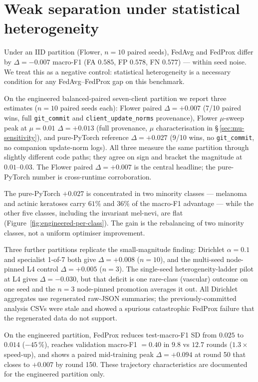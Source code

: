 \documentclass[11pt,a4paper]{report}
\begin{document}
\section{Weak separation under statistical heterogeneity}
\label{sec:statistical-heterogeneity}

Under an IID partition (Flower, $n=10$ paired seeds), FedAvg and FedProx
differ by $\Delta = -0.007$ macro-F1 (FA $0.585$, FP $0.578$, FN $0.577$) ---
within seed noise. We treat this as a negative control: statistical
heterogeneity is a necessary condition for any FedAvg--FedProx gap on this
benchmark.

On the engineered balanced-paired seven-client partition we report three
estimates ($n=10$ paired seeds each): Flower paired $\Delta = +0.007$ (7/10
paired wins, full \texttt{git\_commit} and \texttt{client\_update\_norms}
provenance), Flower $\mu$-sweep peak at $\mu = 0.01$ $\Delta = +0.013$ (full
provenance, $\mu$ characterisation in \S\,\ref{sec:mu-sensitivity}), and
pure-PyTorch reference $\Delta = +0.027$ (9/10 wins, no \texttt{git\_commit},
no companion update-norm logs). All three measure the same partition through
slightly different code paths; they agree on sign and bracket the magnitude
at $0.01$--$0.03$. The Flower paired $\Delta = +0.007$ is the central
headline; the pure-PyTorch number is cross-runtime corroboration.

The pure-PyTorch $+0.027$ is concentrated in two minority classes --- melanoma
and actinic keratoses carry $61\%$ and $36\%$ of the macro-F1 advantage --- while
the other five classes, including the invariant mel-nevi, are flat
(Figure~\ref{fig:engineered-per-class}). The gain is the rebalancing of two
minority classes, not a uniform optimiser improvement.

Three further partitions replicate the small-magnitude finding: Dirichlet
$\alpha = 0.1$ and specialist 1-of-7 both give $\Delta = +0.008$ ($n=10$), and
the multi-seed node-pinned L4 control $\Delta = +0.005$ ($n=3$). The single-seed
heterogeneity-ladder pilot at L4 gives $\Delta = -0.030$, but that deficit is one
rare-class (vascular) outcome on one seed and the $n=3$ node-pinned promotion
averages it out. All Dirichlet aggregates use regenerated raw-JSON summaries; the
previously-committed analysis CSVs were stale and showed a spurious catastrophic
FedProx failure that the regenerated data do not support.

On the engineered partition, FedProx reduces test-macro-F1 SD from $0.025$
to $0.014$ ($-45\,\%$), reaches validation macro-F1 $= 0.40$ in $9.8$ vs
$12.7$ rounds ($1.3\times$ speed-up), and shows a paired mid-training peak
$\Delta = +0.094$ at round 50 that closes to $+0.007$ by round 150. These
trajectory characteristics are documented for the engineered partition only.
\end{document}
